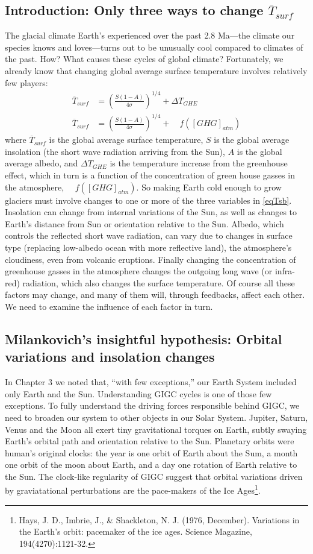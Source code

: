 \subsection{Introduction: Only three ways to change $\overline{T}_{surf}$}
The glacial climate Earth's experienced over the past 2.8 Ma---the climate our species knows and loves---turns out to be unusually cool compared to climates of the past. How? What causes these cycles of global climate? Fortunately, we already know that changing global average surface temperature involves relatively few players:
\begin{align}
	\overline{T}_{surf}&=\left(\frac{S(1-A)}{4\sigma}\right)^{1/4}+\Delta T_{GHE} \label{eqTsa}\\
	\overline{T}_{surf}&=\left(\frac{S(1-A)}{4\sigma}\right)^{1/4}+\quad f([GHG]_{atm}) \label{eqTsb}
\end{align}
where $\overline{T}_{surf}$ is the global average surface temperature, $S$ is the global average insolation (the short wave radiation arriving from the Sun), $A$ is the global average albedo, and $\Delta T_{GHE}$ is the temperature increase from the greenhouse effect, which in turn is a function of the concentration of green house gasses in the atmosphere, $\quad f([GHG]_{atm})$. So making Earth cold enough to grow glaciers must involve changes to one or more of the three variables in \ref{eqTsb}. Insolation can change from internal variations of the Sun, as well as changes to Earth's distance from Sun or orientation relative to the Sun. Albedo, which controls the reflected short wave radiation, can vary due to changes in surface type (replacing low-albedo ocean with more reflective land), the atmosphere's cloudiness, even from volcanic eruptions. Finally changing the concentration of greenhouse gasses in the atmosphere changes the outgoing long wave (or infra-red) radiation, which also changes the surface temperature. Of course all these factors may change, and many of them will, through feedbacks, affect each other. We need to examine the influence of each factor in turn.\\

\subsection{Milankovich's insightful hypothesis: Orbital variations and insolation changes}
In Chapter 3 we noted that, ``with few exceptions,'' our Earth System included only Earth and the Sun. Understanding GIGC cycles is one of those few exceptions. To fully understand the driving forces responsible behind GIGC, we need to broaden our system to other objects in our Solar System. Jupiter, Saturn, Venus and the Moon all exert tiny gravitational torques on Earth, subtly swaying Earth's orbital path and orientation relative to the Sun. Planetary orbits were human's original clocks: the year is one orbit of Earth about the Sum, a month one orbit of the moon about Earth, and a day one rotation of Earth relative to the Sun. The clock-like regularity of GIGC suggest that orbital variations driven by graviatational perturbations are the pace-makers of the Ice Ages\footnote{Hays, J. D., Imbrie, J., \& Shackleton, N. J. (1976, December). Variations in the Earth's orbit: pacemaker of the ice ages. Science Magazine, 194(4270):1121-32.}. 
